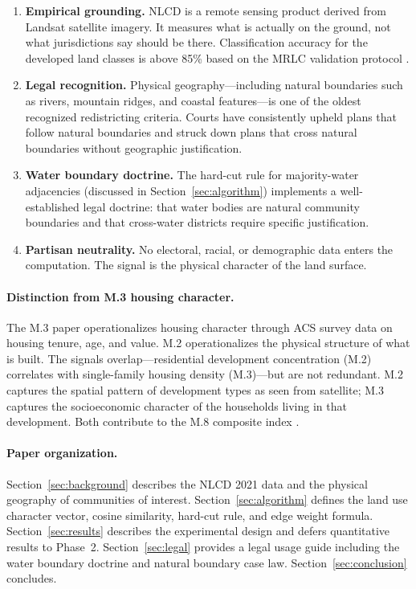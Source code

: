 \begin{enumerate}
  \item \textbf{Empirical grounding.}
    NLCD is a remote sensing product derived from Landsat satellite imagery.
    It measures what is actually on the ground, not what jurisdictions say
    should be there.
    Classification accuracy for the developed land classes is above 85\%
    based on the MRLC validation protocol \citep{homer2020nlcd,dewitz2023nlcd2021}.
  \item \textbf{Legal recognition.}
    Physical geography---including natural boundaries such as rivers, mountain
    ridges, and coastal features---is one of the oldest recognized redistricting
    criteria.
    Courts have consistently upheld plans that follow natural boundaries
    and struck down plans that cross natural boundaries without geographic
    justification.
  \item \textbf{Water boundary doctrine.}
    The hard-cut rule for majority-water adjacencies (discussed in
    Section~\ref{sec:algorithm}) implements a well-established legal doctrine:
    that water bodies are natural community boundaries and that cross-water
    districts require specific justification.
  \item \textbf{Partisan neutrality.}
    No electoral, racial, or demographic data enters the computation.
    The signal is the physical character of the land surface.
\end{enumerate}

\paragraph{Distinction from M.3 housing character.}
The M.3 paper \citep{m3housing} operationalizes housing character through
ACS survey data on housing tenure, age, and value.
M.2 operationalizes the physical structure of what is built.
The signals overlap---residential development concentration (M.2)
correlates with single-family housing density (M.3)---but are not
redundant.
M.2 captures the spatial pattern of development types as seen from satellite;
M.3 captures the socioeconomic character of the households living in
that development.
Both contribute to the M.8 composite index \citep{m8composite}.

\paragraph{Paper organization.}
Section~\ref{sec:background} describes the NLCD 2021 data and the
physical geography of communities of interest.
Section~\ref{sec:algorithm} defines the land use character vector,
cosine similarity, hard-cut rule, and edge weight formula.
Section~\ref{sec:results} describes the experimental design and
defers quantitative results to Phase~2.
Section~\ref{sec:legal} provides a legal usage guide including the
water boundary doctrine and natural boundary case law.
Section~\ref{sec:conclusion} concludes.
